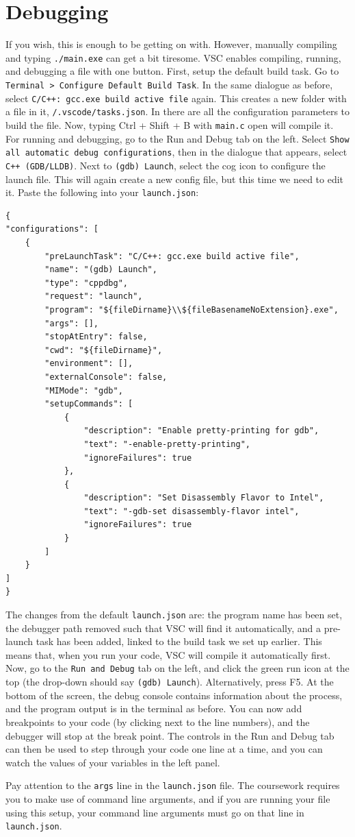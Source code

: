 \documentclass{article}
\begin{document}
\section{Debugging}
If you wish, this is enough to be getting on with. However, manually compiling and typing \verb|./main.exe| can get a bit tiresome. VSC enables compiling, running, and debugging a file with one button. First, setup the default build task. Go to  \verb|Terminal > Configure Default Build Task|. In the same dialogue as before, select \verb|C/C++: gcc.exe build active file| again. This creates a new folder with a file in it, \verb|/.vscode/tasks.json|. In there are all the configuration parameters to build the file. Now, typing Ctrl + Shift + B with \verb|main.c| open will compile it. For running and debugging, go to the Run and Debug tab on the left. Select \verb|Show all automatic debug configurations|, then in the dialogue that appears, select \verb|C++ (GDB/LLDB)|. Next to \verb|(gdb) Launch|, select the cog icon to configure the launch file. This will again create a new config file, but this time we need to edit it. Paste the following into your \verb|launch.json|:

\begin{verbatim}
{
"configurations": [
    {   
        "preLaunchTask": "C/C++: gcc.exe build active file",
        "name": "(gdb) Launch",
        "type": "cppdbg",
        "request": "launch",
        "program": "${fileDirname}\\${fileBasenameNoExtension}.exe",
        "args": [],
        "stopAtEntry": false,
        "cwd": "${fileDirname}",
        "environment": [],
        "externalConsole": false,
        "MIMode": "gdb",
        "setupCommands": [
            {
                "description": "Enable pretty-printing for gdb",
                "text": "-enable-pretty-printing",
                "ignoreFailures": true
            },
            {
                "description": "Set Disassembly Flavor to Intel",
                "text": "-gdb-set disassembly-flavor intel",
                "ignoreFailures": true
            }
        ]
    }
]
}
\end{verbatim}
The changes from the default \verb|launch.json| are: the program name has been set, the debugger path removed such that VSC will find it automatically, and a pre-launch task has been added, linked to the build task we set up earlier. This means that, when you run your code, VSC will compile it automatically first. Now, go to the \verb|Run and Debug| tab on the left, and click the green run icon at the top (the drop-down should say \verb|(gdb) Launch|). Alternatively, press F5. At the bottom of the screen, the debug console contains information about the process, and the program output is in the terminal as before. You can now add breakpoints to your code (by clicking next to the line numbers), and the debugger will stop at the break point. The controls in the Run and Debug tab can then be used to step through your code one line at a time, and you can watch the values of your variables in the left panel. 

Pay attention to the \verb|args| line in the \verb|launch.json| file. The coursework requires you to make use of command line arguments, and if you are running your file using this setup, your command line arguments must go on that line in \verb|launch.json|.
\end{document}
